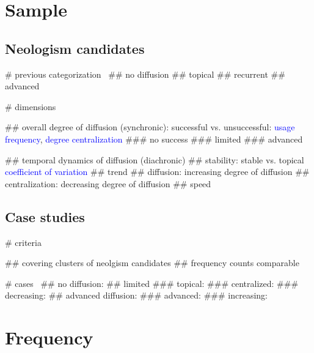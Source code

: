 \documentclass[a4paper]{scrartcl}
\newcommand{\mtrc}[1]{\textcolor{blue}{#1}}
\begin{document}
\section{Sample}

  \subsection{Neologism candidates}

    \begin{easylist}[itemize]

      # previous categorization~\parencite{Kerremans2015}
        ## no diffusion
        ## topical
        ## recurrent
        ## advanced

      # dimensions

        ## overall degree of diffusion (synchronic): successful vs. unsuccessful: \mtrc{usage frequency}, \mtrc{degree centralization}
          ### no success
          ### limited
          ### advanced

        ## temporal dynamics of diffusion (diachronic)
          ## stability: stable vs. topical \mtrc{coefficient of variation}
          ## trend
            ## diffusion: increasing degree of diffusion
            ## centralization: decreasing degree of diffusion
          ## speed

    \end{easylist}

  \subsection{Case studies}

    \begin{easylist}[itemize]

      # criteria

        ## covering clusters of neolgism candidates
        ## frequency counts comparable

      # cases~\parencite{Kerremans2015}
        ## no diffusion: 
        ## limited
          ### topical: 
          ### centralized: 
          ### decreasing: 
        ## advanced diffusion:
          ### advanced: 
          ### increasing: 

    \end{easylist}

\section{Frequency}
\end{document}
